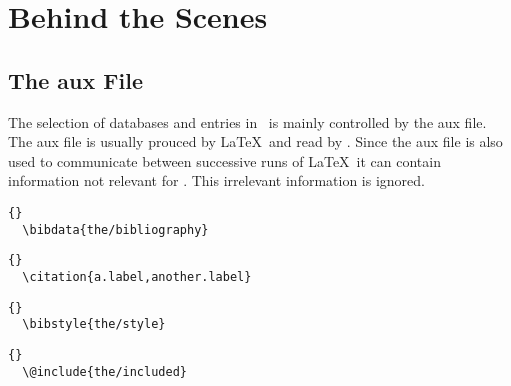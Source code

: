 
\chapter{Behind the Scenes}

\section{The aux File}


The selection of databases and entries in \ExBib\ is mainly controlled
by the aux file. The aux file is usually prouced by \LaTeX\ and read by
\ExBib. Since the aux file is also used to communicate between successive
runs of \LaTeX\ it can contain information not relevant for \ExBib.
This irrelevant information is ignored.


\INCOMPLETE

\begin{lstlisting}{}
  \bibdata{the/bibliography}
\end{lstlisting}

\INCOMPLETE

\begin{lstlisting}{}
  \citation{a.label,another.label}
\end{lstlisting}

\INCOMPLETE

\begin{lstlisting}{}
  \bibstyle{the/style}
\end{lstlisting}

\INCOMPLETE

\begin{lstlisting}{}
  \@include{the/included}
\end{lstlisting}

\INCOMPLETE

\endinput
%
